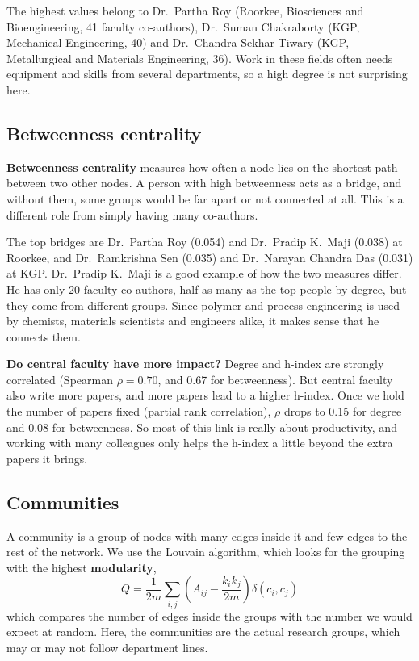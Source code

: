 \documentclass[conference,10pt]{IEEEtran}
\begin{document}
The highest values belong to Dr.~Partha Roy (Roorkee, Biosciences and Bioengineering, 41 faculty co-authors),
Dr.~Suman Chakraborty (KGP, Mechanical Engineering, 40) and Dr.~Chandra Sekhar Tiwary (KGP, Metallurgical and Materials
Engineering, 36). Work in these fields often needs equipment and skills from several departments, so a high degree is
not surprising here.

\subsection{Betweenness centrality}
\textbf{Betweenness centrality} measures how often a node lies on the shortest path between two other nodes. A person
with high betweenness acts as a bridge, and without them, some groups would be far apart or not connected at all. This
is a different role from simply having many co-authors.

The top bridges are Dr.~Partha Roy (0.054) and Dr.~Pradip K.\ Maji (0.038) at Roorkee, and Dr.~Ramkrishna Sen (0.035)
and Dr.~Narayan Chandra Das (0.031) at KGP. Dr.~Pradip K.\ Maji is a good example of how the two measures differ. He
has only 20 faculty co-authors, half as many as the top people by degree, but they come from different groups. Since
polymer and process engineering is used by chemists, materials scientists and engineers alike, it makes sense that he
connects them.

\textbf{Do central faculty have more impact?} Degree and h-index are strongly correlated (Spearman $\rho = 0.70$, and
0.67 for betweenness). But central faculty also write more papers, and more papers lead to a higher h-index. Once we
hold the number of papers fixed (partial rank correlation), $\rho$ drops to 0.15 for degree and 0.08 for betweenness.
So most of this link is really about productivity, and working with many colleagues only helps the h-index a little
beyond the extra papers it brings.

\subsection{Communities}
A community is a group of nodes with many edges inside it and few edges to the rest of the network. We use the Louvain
algorithm, which looks for the grouping with the highest \textbf{modularity},
\[
Q = \frac{1}{2m}\sum_{i,j}\left(A_{ij} - \frac{k_i k_j}{2m}\right)\delta(c_i, c_j)
\]
which compares the number of edges inside the groups with the number we would expect at random. Here, the communities
are the actual research groups, which may or may not follow department lines.
\end{document}
